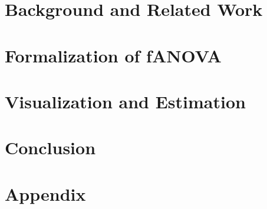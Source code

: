 \documentclass[12pt]{article}
\begin{document}
% 
\section{Background and Related Work}\label{sec:related_work}


\newpage
\section{Formalization of fANOVA}\label{sec:formalization_fANOVA}


\newpage


\newpage
\section{Visualization and Estimation}\label{sec:examples}

\newpage

\section{Conclusion}\label{sec:conclusion}


\RaggedRight


\newpage


    

\setcounter{page}{5} %

\appendix

\section{Appendix}
\label{app}

\newpage
\end{document}

